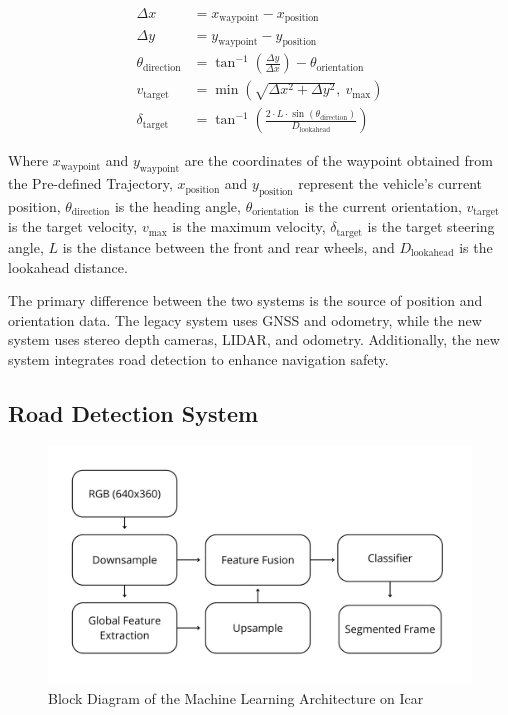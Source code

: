 \documentclass[conference]{IEEEtran}
\begin{document}
\begin{equation}
	\begin{aligned}
		\Delta x &= x_{\text{waypoint}} - x_{\text{position}} \\
		\Delta y &= y_{\text{waypoint}} - y_{\text{position}} \\
		\theta_{\text{direction}} &= \tan^{-1}\left(\frac{\Delta y}{\Delta x}\right) - \theta_{\text{orientation}} \\
		v_{\text{target}} &= \min\left(\sqrt{\Delta x^2 + \Delta y^2}, \ v_{\text{max}}\right) \\
		\delta_{\text{target}} &= \tan^{-1}\left( \frac{2 \cdot L \cdot \sin(\theta_{\text{direction}})}{D_{\text{lookahead}}} \right)
		\label{eq:bicycle_model_full}
	\end{aligned}		
\end{equation}

Where $x_{\text{waypoint}}$ and $y_{\text{waypoint}}$ are the coordinates of the waypoint obtained from the Pre-defined Trajectory, $x_{\text{position}}$ and $y_{\text{position}}$ represent the vehicle's current position, $\theta_{\text{direction}}$ is the heading angle, $\theta_{\text{orientation}}$ is the current orientation, $v_{\text{target}}$ is the target velocity, $v_{\text{max}}$ is the maximum velocity, $\delta_{\text{target}}$ is the target steering angle, $L$ is the distance between the front and rear wheels, and $D_{\text{lookahead}}$ is the lookahead distance.

The primary difference between the two systems is the source of position and orientation data. The legacy system uses GNSS and odometry, while the new system uses stereo depth cameras, LIDAR, and odometry. Additionally, the new system integrates road detection to enhance navigation safety.

\subsection{Road Detection System}
\begin{figure}[H]
	\centering
	\includegraphics[width=\linewidth]{../konten/ml_sys.png}
	\caption{Block Diagram of the Machine Learning Architecture on Icar}
	\label{fig:ml_system}
\end{figure} 
\end{document}
